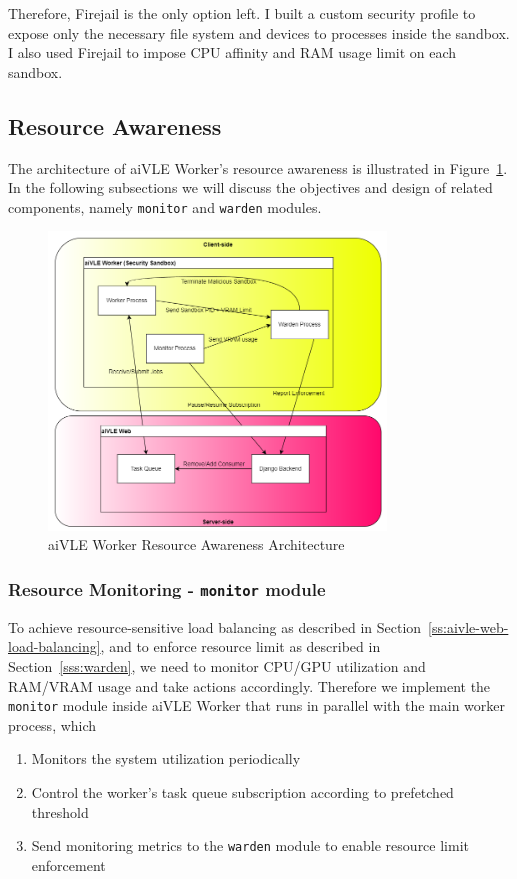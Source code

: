 Therefore, Firejail is the only option left. I built a custom security profile to expose only the necessary file system and devices to processes inside the sandbox. I also used Firejail to impose CPU affinity and RAM usage limit on each sandbox.

\subsection{Resource Awareness}
\label{ss:aivle-worker-resource-awareness}
The architecture of aiVLE Worker's resource awareness is illustrated in Figure~\ref{fig:aivle-worker-resource-awareness-arch}. In the following subsections we will discuss the objectives and design of related components, namely \texttt{monitor} and \texttt{warden} modules.

\begin{figure}[H]
    \centering
    \includegraphics[width=0.8\textwidth]{images/aivle-worker-resource-awareness-arch.png}
    \caption{aiVLE Worker Resource Awareness Architecture}
    \label{fig:aivle-worker-resource-awareness-arch}
\end{figure}

\subsubsection{Resource Monitoring - \texttt{monitor} module}
\label{sss:monitor}
To achieve resource-sensitive load balancing as described in Section~\ref{ss:aivle-web-load-balancing}, and to enforce resource limit as described in Section~\ref{sss:warden}, we need to monitor CPU/GPU utilization and RAM/VRAM usage and take actions accordingly. Therefore we implement the \texttt{monitor} module inside aiVLE Worker that runs in parallel with the main worker process, which
\begin{enumerate}
    \item Monitors the system utilization periodically
    \item Control the worker's task queue subscription according to prefetched threshold
    \item Send monitoring metrics to the \texttt{warden} module to enable resource limit enforcement
\end{enumerate}

